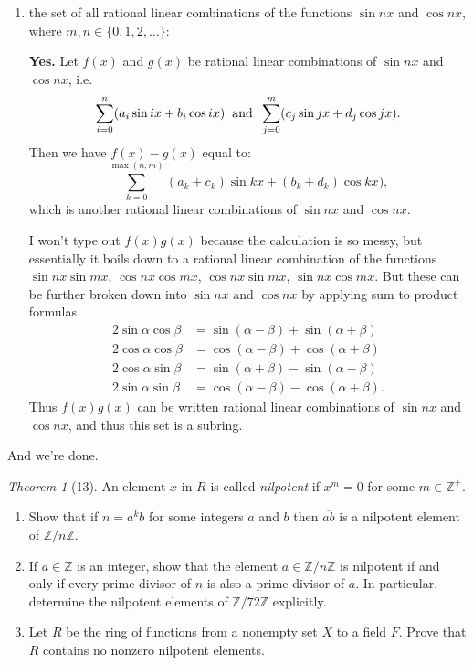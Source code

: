 \documentclass[12pt]{article}
\theoremstyle{remark}
\theoremstyle{named}
\newtheorem*{theorem}{Theorem}
\renewcommand{\a}{\alpha}
\renewcommand{\b}{\beta}
\newcommand{\Z}{\mathbb Z}
\begin{document}
\begin{enumerate}
    \item the set of all rational linear combinations of the functions \(\sin nx\) and \(\cos nx\), where \(m, n \in \{0, 1, 2, \dots\}\): 
    
    \textbf{Yes.} Let $f(x)$ and $g(x)$ be rational linear combinations of \(\sin nx\) and \(\cos nx\), i.e.
    $$\sum_{i = 0}^n (a_i \sin ix + b_i \cos ix) \hspace{2mm} \text{and} \hspace{2mm} \sum_{j = 0}^m (c_j \sin jx + d_j \cos jx).$$
    Then we have $f(x) - g(x)$ equal to:
    $$\sum_{k = 0}^{\max(n, m)} (a_k + c_k) \sin kx + (b_k + d_k) \cos kx),$$
    which is another rational linear combinations of \(\sin nx\) and \(\cos nx\).
    
    I won't type out $f(x)g(x)$ because the calculation is so messy, but essentially it boils down to a rational linear combination of the functions $\sin nx \sin mx$, $\cos nx \cos mx$, $\cos nx \sin mx$, $\sin nx \cos mx$. But these can be further broken down into \(\sin nx\) and \(\cos nx\) by applying sum to product formulas
    \begin{align*}
        2 \sin \a \cos \b &= \sin(\a - \b) + \sin (\a + \b) \\
        2 \cos \a \cos \b &= \cos(\a - \b) + \cos (\a + \b) \\
        2 \cos \a \sin \b &= \sin(\a + \b) - \sin (\a - \b) \\
        2 \sin \a \sin \b &= \cos(\a - \b) - \cos (\a + \b).
    \end{align*}
    Thus $f(x) g(x)$ can be written rational linear combinations of \(\sin nx\) and \(\cos nx\), and thus this set is a subring.
\end{enumerate}
And we're done.
\newline

\begin{theorem}[13]
    An element \(x\) in \(R\) is called \textit{nilpotent} if \(x^m = 0\) for some \(m \in \Z^+\).
    \begin{enumerate}
        \item Show that if \(n = a^kb\) for some integers \(a\) and \(b\) then \(\overline{ab}\) is a nilpotent element of \(\Z / n \Z\). 
        \item If \(a \in \Z\) is an integer, show that the element \(\overline{a} \in \Z / n \Z\) is nilpotent if and only if every prime divisor of \(n\) is also a prime divisor of \(a\). 
        In particular, determine the nilpotent elements of \(\Z / 72 \Z\) explicitly.
        \item Let \(R\) be the ring of functions from a nonempty set \(X\) to a field \(F\). Prove that \(R\) contains no nonzero nilpotent elements.
    \end{enumerate}
\end{theorem}
\end{document}
